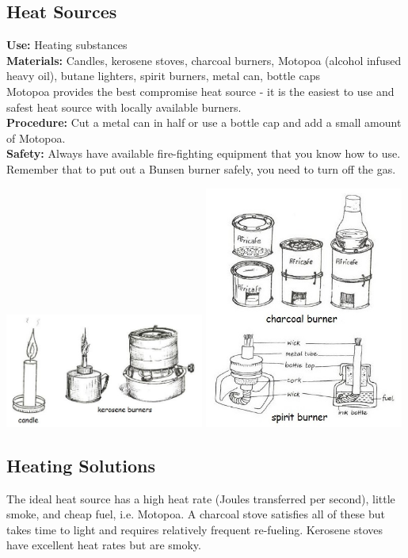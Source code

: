 \begin{multicols}{2}
\section{Heat Sources} 
\label{sec:heatsources}
\vspace{-10pt}
\textbf{Use:} Heating substances\\
\textbf{Materials:} Candles, kerosene stoves, charcoal burners, Motopoa (alcohol infused heavy oil), butane lighters, spirit burners, metal can, bottle caps \\
Motopoa provides the best compromise heat source - it is the easiest to use and safest heat source with locally available burners.\\
\textbf{Procedure:} Cut a metal can in half or use a bottle cap and add a small amount of Motopoa.\\
\textbf{Safety:} Always have available fire-fighting equipment that you know how to use. Remember that to put out a Bunsen burner safely, you need to turn off the gas.
\begin{center}
\includegraphics[width=0.49\textwidth]{./img/source/heat-sources.jpg}
\includegraphics[width=0.49\textwidth]{./img/source/heat-sources-2.jpg}
\end{center}

\subsection{Heating Solutions} 
The ideal heat source has a high heat rate (Joules transferred per second), 
little smoke, 
and cheap fuel, i.e. Motopoa.
A charcoal stove satisfies all of these 
but takes time to light and requires relatively frequent re-fueling. 
Kerosene stoves have excellent heat rates but are smoky. 


\end{multicols}
